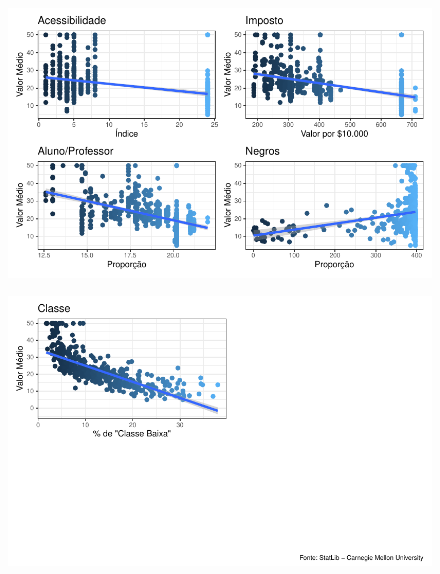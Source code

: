 \documentclass[
  letterpaper,
]{report}
\begin{document}
\begin{figure}[H]

{\centering \includegraphics{Parte-1_files/figure-pdf/unnamed-chunk-5-3.pdf}

}

\end{figure}

\begin{figure}[H]

{\centering \includegraphics{Parte-1_files/figure-pdf/unnamed-chunk-5-4.pdf}

}

\end{figure}
\end{document}

